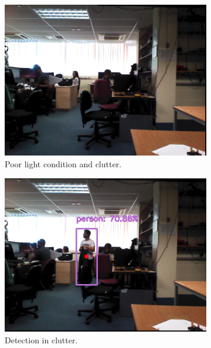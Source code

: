 \begin{figure}[H]
    \begin{subfigure}{.5\textwidth}
        \centering
        \includegraphics[width=.9\linewidth]{images/chapter6_clutter_light.png}
        \caption{Poor light condition and clutter.}
	\end{subfigure}
    \begin{subfigure}{.5\textwidth}
        \centering
        \includegraphics[width=.9\linewidth]{images/chapter6_clutter_light_detection.png}
        \caption{Detection in clutter.}
	\end{subfigure}
    \begin{subfigure}{.5\textwidth}
        \centering

\end{subfigure}
\end{figure}
